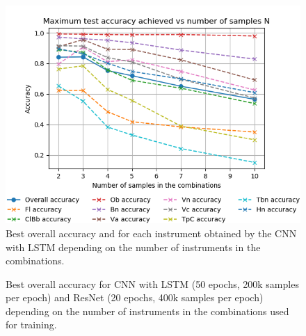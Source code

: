 \documentclass[runningheads,a4paper]{llncs}
\begin{document}
\begin{figure}
\begin{center}
\includegraphics[scale=0.4]{../ISMIR_2020/figs/Acc_vs_N_CNN.png}
\caption{Best overall accuracy and for each instrument obtained by the CNN with LSTM depending on the number of instruments in the combinations. \label{best_acc_cnn}}
\end{center}
\end{figure}

\begin{figure}
  \caption{Best overall accuracy for CNN with LSTM (50 epochs, 200k samples per epoch) and ResNet (20 epochs, 400k samples per epoch) depending on the number of instruments in the combinations used for training. \label{cnn_vs_resnet}}
\end{figure}
\end{document}
